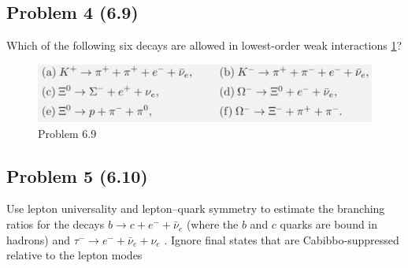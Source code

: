\documentclass{article}
\begin{document}
\subsection*{Problem 4 (6.9)}
\begin{mdframed}
Which of the following six decays are allowed in lowest-order weak interactions \cref{fig: 6.9}?
\end{mdframed}
\begin{figure}[h!]
\centering
\includegraphics[width = .9\textwidth]{6.9.png}
\caption{Problem 6.9}
\label{fig: 6.9}
\end{figure}


\subsection*{Problem 5 (6.10)}
\begin{mdframed}
Use lepton universality and lepton–quark symmetry to estimate the branching ratios for the decays $b →  c + e^{-} + \bar{ν}_e$ (where the $b$ and $c$ quarks are bound in hadrons) and $τ^{-} →  e^{-} + \bar{ν}_e + ν_e$ . Ignore final states that are Cabibbo-suppressed relative to the lepton modes
\end{mdframed}
\end{document}
